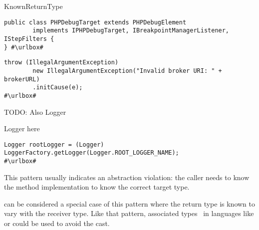 \begin{pattern}{KnownReturnType}
\begin{verbatim}
public class PHPDebugTarget extends PHPDebugElement
        implements IPHPDebugTarget, IBreakpointManagerListener, IStepFilters {
} #\urlbox#
\end{verbatim}

\def\urlvar{http://bit.ly/apache_activemq_2EnSivc}

\begin{verbatim}
throw (IllegalArgumentException)
        new IllegalArgumentException("Invalid broker URI: " + brokerURL)
        .initCause(e);
#\urlbox#
\end{verbatim}


TODO: Also Logger

Logger here
\def\urlvar{http://bit.ly/skylot_jadx_2HIoR9X}

\begin{verbatim}
Logger rootLogger = (Logger) LoggerFactory.getLogger(Logger.ROOT_LOGGER_NAME);
#\urlbox#
\end{verbatim}


\discussion{}
This pattern usually indicates an abstraction violation: the caller 
needs to know the method implementation to know the correct target type.

   can be considered a special case of this
  pattern where the return type is known to vary with the receiver type.
  Like that pattern, associated types~\cite{chakravartyAssociatedTypeSynonyms2005}
  in languages like \haskell{} or \rust{} 
  could be used to avoid the cast.

\end{pattern}



